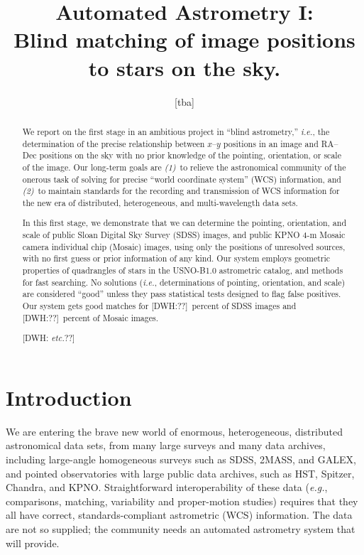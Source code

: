 \documentclass[12pt,preprint]{aastex}
\newcommand{\latin}[1]{\textit{#1}}
\newcommand{\ie}{\latin{i.e.}}
\newcommand{\eg}{\latin{e.g.}}
\newcommand{\etc}{\latin{etc.}}
\begin{document}
\title{
  Automated Astrometry I:\\
  Blind matching of image positions to stars on the sky.
}
\author{
  [tba]
}

\begin{abstract}
We report on the first stage in an ambitious project in ``blind
astrometry,'' \ie, the determination of the precise relationship
between $x$--$y$ positions in an image and RA--Dec positions on the
sky with no prior knowledge of the pointing, orientation, or scale of
the image.  Our long-term goals are \textsl{(1)}~to relieve the
astronomical community of the onerous task of solving for precise
``world coordinate system'' (WCS) information, and \textsl{(2)}~to
maintain standards for the recording and transmission of WCS
information for the new era of distributed, heterogeneous, and
multi-wavelength data sets.

In this first stage, we demonstrate that we can determine the
pointing, orientation, and scale of public Sloan Digital Sky Survey
(SDSS) images, and public KPNO 4-m Mosaic camera individual chip
(Mosaic) images, using only the positions of unresolved sources, with
no first guess or prior information of any kind.  Our system employs
geometric properties of quadrangles of stars in the USNO-B1.0
astrometric catalog, and methods for fast searching.  No solutions
(\ie, determinations of pointing, orientation, and scale) are
considered ``good'' unless they pass statistical tests designed to
flag false positives.  Our system gets good matches for
[DWH:??]~percent of SDSS images and [DWH:??]~percent of Mosaic images.

[DWH: \etc??]
\end{abstract}


\section{Introduction}

We are entering the brave new world of enormous, heterogeneous,
distributed astronomical data sets, from many large surveys and many
data archives, including large-angle homogeneous surveys such as SDSS,
2MASS, and GALEX, and pointed observatories with large public data
archives, such as HST, Spitzer, Chandra, and KPNO.  Straightforward
interoperability of these data (\eg, comparisons, matching,
variability and proper-motion studies) requires that they all have
correct, standards-compliant astrometric (WCS) information.  The data
are not so supplied; the community needs an automated astrometry
system that will provide.
\end{document}

